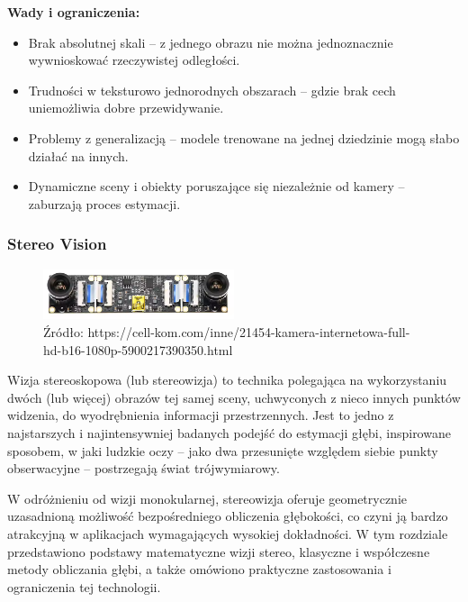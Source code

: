 \documentclass[magisterska]{pracadypl}
\begin{document}
\begin{minipage}[t]{\textwidth}
\textbf{Wady i ograniczenia:}
\begin{itemize}
  \item Brak absolutnej skali – z jednego obrazu nie można jednoznacznie wywnioskować rzeczywistej odległości.

  \item Trudności w teksturowo jednorodnych obszarach – gdzie brak cech uniemożliwia dobre przewidywanie.

  \item Problemy z generalizacją – modele trenowane na jednej dziedzinie mogą słabo działać na innych.

  \item Dynamiczne sceny i obiekty poruszające się niezależnie od kamery – zaburzają proces estymacji.
\end{itemize}
\end{minipage}


\subsubsection{Stereo Vision}

\begin{figure}[h]  %
    \centering  %
    \includegraphics[width=0.5\textwidth]{images/MAINSTEREO.png}  %
    \captionsetup{labelformat=empty, font=footnotesize}
    \caption{Źródło: https://cell-kom.com/inne/21454-kamera-internetowa-full-hd-b16-1080p-5900217390350.html}
    \label{fig:mono}  %
\end{figure}

Wizja stereoskopowa (lub stereowizja) to technika polegająca na wykorzystaniu dwóch (lub więcej) obrazów tej samej sceny, uchwyconych z nieco innych punktów widzenia, do wyodrębnienia informacji przestrzennych. Jest to jedno z najstarszych i najintensywniej badanych podejść do estymacji głębi, inspirowane sposobem, w jaki ludzkie oczy – jako dwa przesunięte względem siebie punkty obserwacyjne – postrzegają świat trójwymiarowy.

W odróżnieniu od wizji monokularnej, stereowizja oferuje geometrycznie uzasadnioną możliwość bezpośredniego obliczenia głębokości, co czyni ją bardzo atrakcyjną w aplikacjach wymagających wysokiej dokładności. W tym rozdziale przedstawiono podstawy matematyczne wizji stereo, klasyczne i współczesne metody obliczania głębi, a także omówiono praktyczne zastosowania i ograniczenia tej technologii.
\end{document}
